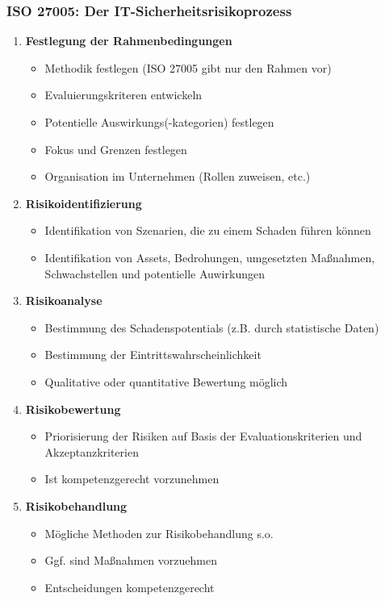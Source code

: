 \subsubsection{ISO 27005: Der IT-Sicherheitsrisikoprozess}
\begin{enumerate}
	\item \textbf{Festlegung der Rahmenbedingungen}
	\begin{itemize}
		\item Methodik festlegen (ISO 27005 gibt nur den Rahmen vor)
		\item Evaluierungskriteren entwickeln
		\item Potentielle Auswirkungs(-kategorien) festlegen
		\item Fokus und Grenzen festlegen
		\item Organisation im Unternehmen (Rollen zuweisen, etc.)
	\end{itemize}
	\item \textbf{Risikoidentifizierung}
	\begin{itemize}
		\item Identifikation von Szenarien, die zu einem Schaden führen können
		\item Identifikation von Assets, Bedrohungen, umgesetzten Maßnahmen, Schwachstellen und potentielle Auwirkungen
	\end{itemize}
	\item \textbf{Risikoanalyse}
	\begin{itemize}
		\item Bestimmung des Schadenspotentials (z.B. durch statistische Daten)
		\item Bestimmung der Eintrittswahrscheinlichkeit
		\item Qualitative oder quantitative Bewertung möglich
	\end{itemize}
	\item \textbf{Risikobewertung}
	\begin{itemize}
		\item Priorisierung der Risiken auf Basis der Evaluationskriterien und Akzeptanzkriterien
		\item Ist kompetenzgerecht vorzunehmen
	\end{itemize}
	\item \textbf{Risikobehandlung}
	\begin{itemize}
		\item Mögliche Methoden zur Risikobehandlung s.o.
		\item Ggf. sind Maßnahmen vorzuehmen
		\item Entscheidungen kompetenzgerecht
	\end{itemize}
\end{enumerate}

